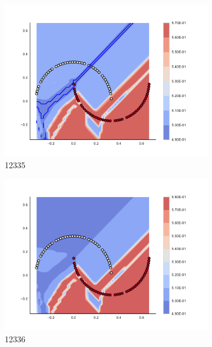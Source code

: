 \begin{figure}[h]
\begin{subfigure}[b]{0.09\textwidth}
    \includegraphics[clip, trim=2.35cm 1.75cm 4.5cm 0cm,width=\textwidth]{img/convergence/12335.pdf}
    \caption{12335}
    \label{fig:convergence_12335}
\end{subfigure}
%
\begin{subfigure}[b]{0.09\textwidth}
    \includegraphics[clip, trim=2.35cm 1.75cm 4.5cm 0cm,width=\textwidth]{img/convergence/12336.pdf}
    \caption{12336}
    \label{fig:convergence_12336}
\end{subfigure}
%
\begin{subfigure}[b]{0.09\textwidth}

\end{subfigure}
\end{figure}
